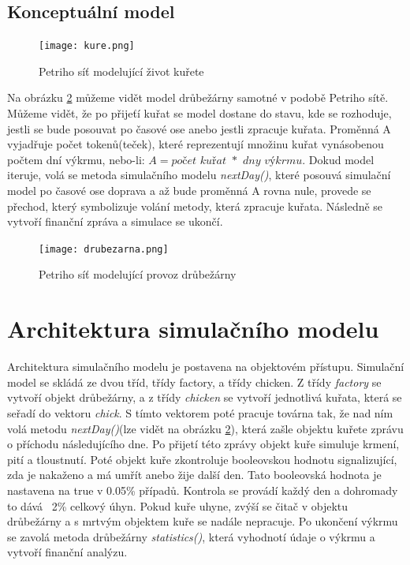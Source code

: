 \documentclass[a4paper,10pt]{article}
\begin{document}
\subsection{Konceptuální model}
\begin{figure}[h]
\caption{Petriho síť modelující život kuřete}
\texttt{[image: kure.png]}
\label{obr:petri_kure}
\end{figure}

Na obrázku \ref{obr:drubezarna} můžeme vidět model drůbežárny samotné v podobě Petriho sítě. Můžeme vidět, že po přijeťí kuřat
se model dostane do stavu, kde se rozhoduje, jestli se bude posouvat po časové ose anebo jestli zpracuje
kuřata. Proměnná A vyjadřuje počet tokenů(teček), které reprezentují množinu kuřat vynásobenou počtem dní výkrmu,
nebo-li: 
$A=\textit{počet kuřat }*\textit{ dny výkrmu}$.
Dokud model iteruje, volá se metoda simulačního modelu \textit{nextDay()}, které posouvá simulační model po časové ose doprava
a až bude proměnná A rovna nule, provede se přechod, který symbolizuje volání metody, která zpracuje kuřata. Následně 
se vytvoří finanční zpráva a simulace se ukončí.


\begin{figure}[h]
\caption{Petriho síť modelující provoz drůbežárny}
\texttt{[image: drubezarna.png]}
\label{obr:drubezarna}
\end{figure}

\pagebreak

\section{Architektura simulačního modelu}\label{architektura}
Architektura simulačního modelu je postavena na objektovém přístupu. Simulační model se skládá ze dvou tříd,
třídy factory, a třídy chicken. Z třídy \textit{factory} se vytvoří objekt drůbežárny, a z třídy \textit{chicken}
se vytvoří jednotlivá kuřata, která se seřadí do vektoru \textit{chick}. S tímto vektorem poté pracuje továrna tak,
že nad ním volá metodu \textit{nextDay()}(lze vidět na obrázku \ref{obr:drubezarna}), která zašle objektu kuřete
zprávu o příchodu následujícího dne. Po přijetí této zprávy objekt kuře simuluje krmení, pití a tloustnutí.
Poté objekt kuře zkontroluje booleovskou hodnotu signalizující, zda je nakaženo a má umřít anebo žije další den.
Tato booleovská hodnota je nastavena na true v 0.05\% případů. Kontrola se provádí každý den a dohromady to dává ~2\% celkový úhyn.
Pokud kuře uhyne, zvýší se čitač v objektu drůbežárny a s mrtvým objektem kuře se nadále nepracuje.
Po ukončení výkrmu se zavolá metoda drůbežárny \textit{statistics()}, která vyhodnotí údaje o výkrmu a vytvoří finanční analýzu.
\end{document}
